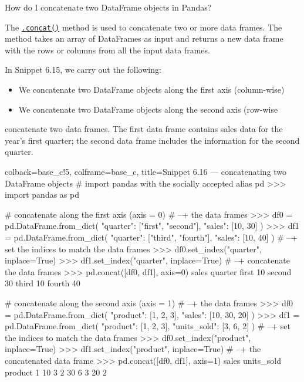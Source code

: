 \documentclass[a4paper,11pt]{book}
\newcommand{\question}[1]{%
    \begin{tcolorbox}[colback=comp_c!10,colframe=comp_c,sidebyside align=top,width=\linewidth,before skip=1ex]
        #1
    \end{tcolorbox}
    \switchcolumn%
}
\newcommand{\note}[1]{%
    \begin{tcolorbox}[colback=white!0,colframe=white!10,width=\linewidth,before skip=1ex]
        #1
    \end{tcolorbox}
}
\begin{document}
\begin{paracol}{2}
	\question{\raggedright How do I concatenate two DataFrame objects in Pandas?}
	\note{The \href{https://pandas.pydata.org/docs/reference/api/pandas.concat.html?highlight=concat#pandas.concat}{\texttt{.concat()}} method is used to concatenate two or more data frames. The method takes an array of DataFrames as input and returns a new data frame with the rows or columns from all the input data frames.
	
	\quad In Snippet 6.15, we carry out the following:
	
	\begin{itemize}
		\item We concatenate two DataFrame objects along the first axis (column-wise)
		\item We concatenate two DataFrame objects along the second axis (row-wise
	\end{itemize}
	
	\quad concatenate two data frames. The first data frame contains sales data for the year's first quarter; the second data frame includes the information for the second quarter.
	}
\end{paracol}

\begin{pythoncode}[linenos=True]{colback=base_c!5, colframe=base_c, title=\sffamily Snippet 6.16 --- concatenating two DataFrame objects}
# import pandas with the socially accepted alias pd
>>> import pandas as pd

# concatenate along the first axis (axis = 0)
# --+ the data frames 
>>> df0 = pd.DataFrame.from_dict(
	{"quarter": ["first", "second"], "sales": [10, 30]}
    )
>>> df1 = pd.DataFrame.from_dict(
	{"quarter": ["third", "fourth"], "sales": [10, 40]}
    )
# --+ set the indices to match the data frames
>>> df0.set_index("quarter", inplace=True)
>>> df1.set_index("quarter", inplace=True)
# --+ concatenate the data frames
>>> pd.concat([df0, df1], axis=0)
         sales
quarter       
first       10
second      30
third       10
fourth      40

# concatenate along the second axis (axis = 1) 
# --+ the data frames
>>> df0 = pd.DataFrame.from_dict(
	{"product": [1, 2, 3], "sales": [10, 30, 20]}
    )
>>> df1 = pd.DataFrame.from_dict(
	{"product": [1, 2, 3], "units_sold": [3, 6, 2]}
    )
# --+ set the indices to match the data frames
>>> df0.set_index("product", inplace=True)
>>> df1.set_index("product", inplace=True)
# --+ the concatenated data frame
>>> pd.concat([df0, df1], axis=1)
         sales  units_sold
product                   
1           10           3
2           30           6
3           20           2

\end{pythoncode}
\end{document}

